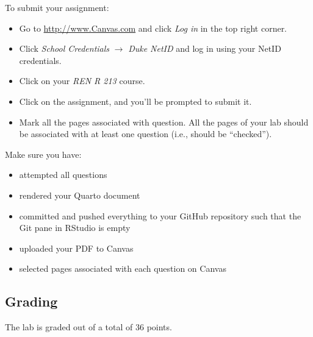 \documentclass[
  letterpaper,
  DIV=11,
  numbers=noendperiod]{scrartcl}
\providecommand{\tightlist}{%
  \setlength{\itemsep}{0pt}\setlength{\parskip}{0pt}}
\begin{document}
To submit your assignment:

\begin{itemize}
\tightlist
\item
  Go to \url{http://www.Canvas.com} and click \emph{Log in} in the top
  right corner.
\item
  Click \emph{School Credentials} \(\rightarrow\) \emph{Duke NetID} and
  log in using your NetID credentials.
\item
  Click on your \emph{REN R 213} course.
\item
  Click on the assignment, and you'll be prompted to submit it.
\item
  Mark all the pages associated with question. All the pages of your lab
  should be associated with at least one question (i.e., should be
  ``checked'').
\end{itemize}

\begin{tcolorbox}[enhanced jigsaw, toptitle=1mm, bottomrule=.15mm, colbacktitle=quarto-callout-important-color!10!white, colframe=quarto-callout-important-color-frame, leftrule=.75mm, breakable, toprule=.15mm, colback=white, arc=.35mm, coltitle=black, left=2mm, opacitybacktitle=0.6, bottomtitle=1mm, opacityback=0, title=\textcolor{quarto-callout-important-color}{\faExclamation}\hspace{0.5em}{Checklist}, titlerule=0mm, rightrule=.15mm]

Make sure you have:

\begin{itemize}
\tightlist
\item
  attempted all questions
\item
  rendered your Quarto document
\item
  committed and pushed everything to your GitHub repository such that
  the Git pane in RStudio is empty
\item
  uploaded your PDF to Canvas
\item
  selected pages associated with each question on Canvas
\end{itemize}

\end{tcolorbox}

\subsection{Grading}\label{grading}

The lab is graded out of a total of 36 points.
\end{document}

